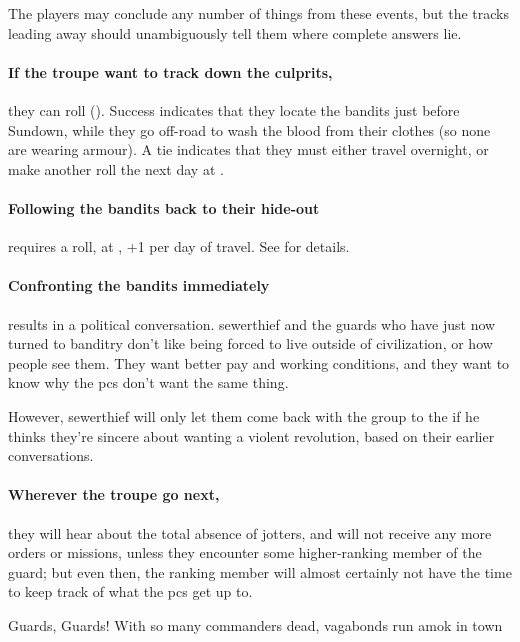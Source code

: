 The players may conclude any number of things from these events, but the tracks leading away should unambiguously tell them where complete answers lie.

\paragraph{If the troupe want to track down the culprits,}
they can roll  (\tn[8]).
Success indicates that they locate the bandits just before Sundown, while they go off-road to wash the blood from their clothes (so none are wearing armour).
A tie indicates that they must either travel overnight, or make another roll the next day at \tn[10].

\paragraph{Following the bandits back to their hide-out}
requires a  roll, at \tn[10], +1 per day of travel.
See  for details.

\paragraph{Confronting the bandits immediately}
results in a political conversation.
\Gls{sewerthief} and the \glspl{guard} who have just now turned to banditry don't like being forced to live outside of civilization, or how people see them.
They want better pay and working conditions, and they want to know why the \glspl{pc} don't want the same thing.

However, \gls{sewerthief} will only let them come back with the group to the  if he thinks they're sincere about wanting a violent revolution, based on their earlier conversations.

\paragraph{Wherever the troupe go next,}
they will hear about the total absence of \glspl{jotter}, and will not receive any more orders or missions, unless they encounter some higher-ranking member of the \gls{guard}; but even then, the ranking member will almost certainly not have the time to keep track of what the \glspl{pc} get up to.

{Guards, Guards!}%
{With so many commanders dead,  vagabonds run amok in town}%

